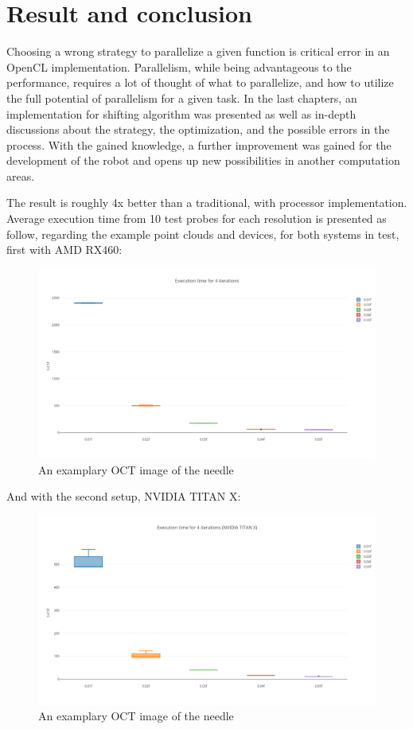 \chapter{Result and conclusion}
Choosing a wrong strategy to parallelize a given function is critical error in an OpenCL implementation. Parallelism, while being advantageous to the performance, requires a lot of thought of what to parallelize, and how to utilize the full potential of parallelism for a given task. In the last chapters, an implementation for shifting algorithm was presented as well as in-depth discussions about the strategy, the optimization, and the possible errors in the process. With the gained knowledge, a further improvement was gained for the development of the robot and opens up new possibilities in another computation areas.

The result is roughly 4x better than a traditional, with processor implementation. Average execution time from 10 test probes for each resolution is presented as follow, regarding the example point clouds and devices, for both systems in test, first with AMD RX460:

\begin{figure}[H]
	\centering
	\includegraphics[width=14cm]{images/AllfouriterationRX460.png}
	\caption{An examplary OCT image of the needle}
	\label{ExampleOCTImage}
\end{figure}
\pagebreak
And with the second setup, NVIDIA TITAN X:

\begin{figure}[H]
	\centering
	\includegraphics[width=14cm]{images/AllfourIterationTITANX.png}
	\caption{An examplary OCT image of the needle}
	\label{ExampleOCTImage}
\end{figure}

